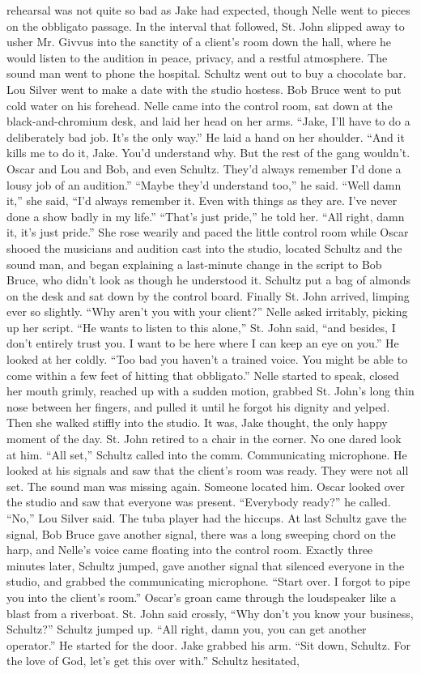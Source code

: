 \documentclass{novel}
\begin{document}
rehearsal was not quite so bad as Jake had expected, though Nelle went to pieces on the obbligato passage. In the interval that followed, St. John slipped away to usher Mr. Givvus into the sanctity of a client’s room down the hall, where he would listen to the audition in peace, privacy, and a restful atmosphere. The sound man went to phone the hospital. Schultz went out to buy a chocolate bar. Lou Silver went to make a date with the studio hostess. Bob Bruce went to put cold water on his forehead. Nelle came into the control room, sat down at the black-and-chromium desk, and laid her head on her arms. “Jake, I'll have to do a deliberately bad job. It’s the only way.” He laid a hand on her shoulder. “And it kills me to do it, Jake. You’d understand why. But the rest of the gang wouldn’t. Oscar and Lou and Bob, and even Schultz. They’d always remember I’d done a lousy job of an audition.” “Maybe they’d understand too,” he said. “Well damn it,” she said, “I’d always remember it. Even with things as they are. I’ve never done a show badly in my life.” “That’s just pride,” he told her. “All right, damn it, it’s just pride.” She rose wearily and paced the little control room while Oscar shooed the musicians and audition cast into the studio, located Schultz and the sound man, and began explaining a last-minute change in the script to Bob Bruce, who didn’t look as though he understood it. Schultz put a bag of almonds on the desk and sat down by the control board. Finally St. John arrived, limping ever so slightly. “Why aren’t you with your client?” Nelle asked irritably, picking up her script. “He wants to listen to this alone,” St. John said, “and besides, I don’t entirely trust you. I want to be here where I can keep an eye on you.” He looked at her coldly. “Too bad you haven’t a trained voice. You might be able to come within a few feet of hitting that obbligato.” Nelle started to speak, closed her mouth grimly, reached up with a sudden motion, grabbed St. John’s long thin nose between her fingers, and pulled it until he forgot his dignity and yelped. Then she walked stiffly into the studio. It was, Jake thought, the only happy moment of the day. St. John retired to a chair in the corner. No one dared look at him. “All set,” Schultz called into the comm. Communicating microphone. He looked at his signals and saw that the client’s room was ready. They were not all set. The sound man was missing again. Someone located him. Oscar looked over the studio and saw that everyone was present. “Everybody ready?” he called. “No,” Lou Silver said. The tuba player had the hiccups. At last Schultz gave the signal, Bob Bruce gave another signal, there was a long sweeping chord on the harp, and Nelle’s voice came floating into the control room. Exactly three minutes later, Schultz jumped, gave another signal that silenced everyone in the studio, and grabbed the communicating microphone. “Start over. I forgot to pipe you into the client’s room.” Oscar’s groan came through the loudspeaker like a blast from a riverboat. St. John said crossly, “Why don’t you know your business, Schultz?” Schultz jumped up. “All right, damn you, you can get another operator.” He started for the door. Jake grabbed his arm. “Sit down, Schultz. For the love of God, let’s get this over with.” Schultz hesitated, 
\end{document}
